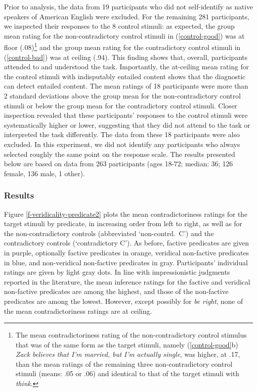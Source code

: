 \documentclass[11pt,fleqn]{article}
\newcommand{\6}{\mbox{$[\hspace*{-.6mm}[$}}
\newcommand{\9}{\mbox{$]\hspace*{-.6mm}]$}}
\begin{document}
{Prior to analysis, the data from 19 participants who did not self-identify as native speakers of American English were excluded. For the remaining 281 participants, we inspected their responses to the 8 control stimuli: as expected, the group mean rating for the non-contradictory control stimuli in (\ref{control-good}) was at floor (.08)\footnote{The mean contradictoriness rating of the non-contradictory control stimulus that was of the same form as the target stimuli, namely (\ref{control-good}b) {\em Zack believes that I'm married, but I'm actually single}, was higher, at .17, than the mean ratings of the remaining three non-contradictory control stimuli (means: .05 or .06) and identical to that of the target stimuli with {\em think}.}  and the group mean rating for the contradictory control stimuli in (\ref{control-bad}) was at ceiling (.94). This finding shows that, overall, participants attended to and understood the task. Importantly, the at-ceiling mean rating for the control stimuli with indisputably entailed content shows that the diagnostic can detect entailed content. The mean ratings of 18 participants were more than 2 standard deviations above the group mean for the non-contradictory control stimuli or below the group mean for the contradictory control stimuli. Closer inspection revealed that these participants' responses to the control stimuli were systematically higher or lower, suggesting that they did not attend to the task or interpreted the task differently. The data from these 18 participants were also excluded. In this experiment, we did not identify any participants who always selected roughly the same point on the response scale. The results presented below are based on data from 263 participants (ages 18-72; median: 36; 126 female, 136 male, 1 other).

\subsubsection{Results}


Figure \ref{f-veridicality-predicate2} plots the mean contradictoriness ratings for the target stimuli by predicate, in increasing order from left to right, as well as for the non-contradictory controls (abbreviated `non-contrd.\ C')  and  the contradictory controls (`contradictory C'). As before, factive predicates are given in purple, optionally factive predicates in orange, veridical non-factive predicates in blue, and non-veridical non-factive predicates in gray. Participants' individual ratings are given by light gray dots. In line with impressionistic judgments reported in the literature, the mean inference ratings for the factive and veridical non-factive predicates are among the highest, and those of the non-factive predicates are among the lowest. However, except possibly for {\em be right}, none of the mean contradictoriness ratings are at ceiling.

}
\end{document}
